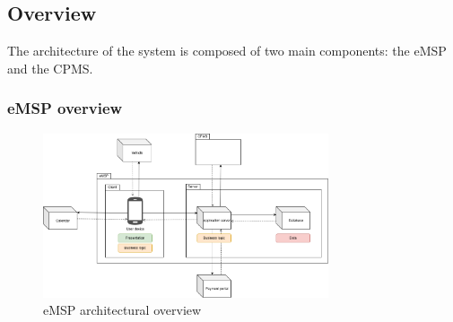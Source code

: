 
\subsection{Overview}
The architecture of the system is composed of two main components: the \ac{eMSP} and the \ac{CPMS}.

\subsubsection{\ac{eMSP} overview}

\begin{figure}[!h]
    \begin{center}
        \includegraphics[keepaspectratio, width=0.75\textwidth]{Graphics/DD-eMSP-overview.drawio.png}
        \caption{\ac{eMSP} architectural overview}
        \label{fig:eMSP-overview-architecture}
    \end{center}
\end{figure}

